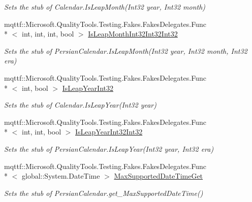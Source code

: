 \begin{DoxyCompactItemize}
\begin{DoxyCompactList}\small\item\em Sets the stub of Calendar.\-Is\-Leap\-Month(\-Int32 year, Int32 month)\end{DoxyCompactList}\item 
mqttf\-::\-Microsoft.\-Quality\-Tools.\-Testing.\-Fakes.\-Fakes\-Delegates.\-Func\\*
$<$ int, int, int, bool $>$ \hyperlink{class_system_1_1_globalization_1_1_fakes_1_1_stub_persian_calendar_a9f4ec23d433faa6be7ff8cf0716b16e1}{Is\-Leap\-Month\-Int32\-Int32\-Int32}
\begin{DoxyCompactList}\small\item\em Sets the stub of Persian\-Calendar.\-Is\-Leap\-Month(\-Int32 year, Int32 month, Int32 era)\end{DoxyCompactList}\item 
mqttf\-::\-Microsoft.\-Quality\-Tools.\-Testing.\-Fakes.\-Fakes\-Delegates.\-Func\\*
$<$ int, bool $>$ \hyperlink{class_system_1_1_globalization_1_1_fakes_1_1_stub_persian_calendar_a2aaa4eb7f28956310ab80e9078cc5d40}{Is\-Leap\-Year\-Int32}
\begin{DoxyCompactList}\small\item\em Sets the stub of Calendar.\-Is\-Leap\-Year(\-Int32 year)\end{DoxyCompactList}\item 
mqttf\-::\-Microsoft.\-Quality\-Tools.\-Testing.\-Fakes.\-Fakes\-Delegates.\-Func\\*
$<$ int, int, bool $>$ \hyperlink{class_system_1_1_globalization_1_1_fakes_1_1_stub_persian_calendar_a29e663e848e2178951c14bc4d9643698}{Is\-Leap\-Year\-Int32\-Int32}
\begin{DoxyCompactList}\small\item\em Sets the stub of Persian\-Calendar.\-Is\-Leap\-Year(\-Int32 year, Int32 era)\end{DoxyCompactList}\item 
mqttf\-::\-Microsoft.\-Quality\-Tools.\-Testing.\-Fakes.\-Fakes\-Delegates.\-Func\\*
$<$ global\-::\-System.\-Date\-Time $>$ \hyperlink{class_system_1_1_globalization_1_1_fakes_1_1_stub_persian_calendar_a5034270f322777040d87482337ff8017}{Max\-Supported\-Date\-Time\-Get}
\begin{DoxyCompactList}\small\item\em Sets the stub of Persian\-Calendar.\-get\-\_\-\-Max\-Supported\-Date\-Time()\end{DoxyCompactList}\item 

\end{DoxyCompactItemize}

